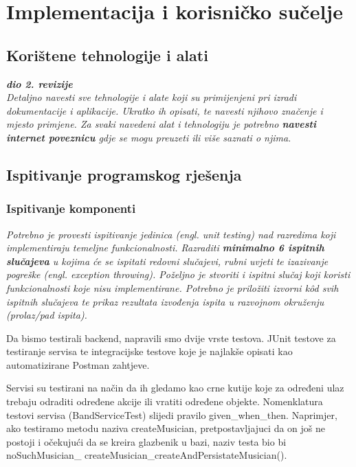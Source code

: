 \chapter{Implementacija i korisničko sučelje}
		
		
		\section{Korištene tehnologije i alati}
		
			\textbf{\textit{dio 2. revizije}} \\
			
			 \textit{Detaljno navesti sve tehnologije i alate koji su primijenjeni pri izradi dokumentacije i aplikacije. Ukratko ih opisati, te navesti njihovo značenje i mjesto primjene. Za svaki navedeni alat i tehnologiju je potrebno \textbf{navesti internet poveznicu} gdje se mogu preuzeti ili više saznati o njima}.
			
			
			\eject 
		
	
		\section{Ispitivanje programskog rješenja}
	
			
			\subsection{Ispitivanje komponenti}
			\textit{Potrebno je provesti ispitivanje jedinica (engl. unit testing) nad razredima koji implementiraju temeljne funkcionalnosti. Razraditi \textbf{minimalno 6 ispitnih slučajeva} u kojima će se ispitati redovni slučajevi, rubni uvjeti te izazivanje pogreške (engl. exception throwing). Poželjno je stvoriti i ispitni slučaj koji koristi funkcionalnosti koje nisu implementirane. Potrebno je priložiti izvorni kôd svih ispitnih slučajeva te prikaz rezultata izvođenja ispita u razvojnom okruženju (prolaz/pad ispita). }
			
			
			
			Da bismo testirali backend, napravili smo dvije vrste testova. JUnit testove za testiranje servisa te integracijske testove koje je najlakše opisati kao automatizirane Postman zahtjeve.
			
			Servisi su testirani na način da ih gledamo kao crne kutije koje za određeni ulaz trebaju odraditi određene akcije ili vratiti određene objekte. Nomenklatura testovi servisa (BandServiceTest) slijedi pravilo given\_when\_then. Naprimjer, ako testiramo metodu naziva createMusician, pretpostavljajuci da on još ne postoji i očekujući da se kreira glazbenik u bazi, naziv testa bio bi 
			noSuchMusician\_
			createMusician\_createAndPersistateMusician().
			
